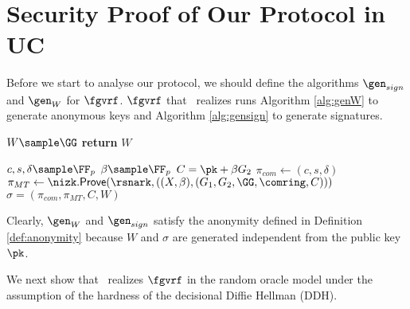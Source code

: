 \section{Security Proof of Our Protocol in UC}
Before we start to analyse our protocol, we should define the algorithms $ \gen_{sign} $ and $ \gen_W $ for $ \fgvrf $. $ \fgvrf $ that \name \ realizes runs Algorithm \ref{alg:genW} to generate  anonymous keys and Algorithm \ref{alg:gensign} to generate signatures.



\begin{algorithm}
	\caption{$\gen_{W}(\comring,\pk,m)$}
	\label{alg:genW}	 	
	\begin{algorithmic}[1]
		\State$ W \sample\GG $
		\State \textbf{return} $ W $
	\end{algorithmic}
	
\end{algorithm}

\begin{algorithm}
	\caption{$\gen_{sign}(\comring,W,\pk,m)$}
	\label{alg:gensign}	 	
	\begin{algorithmic}[1]
		\State $ c,s,\delta \sample \FF_p $
		\State $ \beta \sample \FF_p $
		\State $ C =  \pk + \beta G_2$
		\State $ \pi_{com}  \leftarrow (c,s,\delta)$
		\State $ \pi_{MT} \leftarrow \nizk.\mathsf{Prove}(\rsnark, ((X, \beta),(G_1,G_2, \GG,\comring, C))) $ 
		\State\Return$ \sigma = (\pi_{com},\pi_{MT},C,W) $
	\end{algorithmic}
	
\end{algorithm}

Clearly, $ \gen_{W} $ and $ \gen_{sign} $ satisfy the anonymity defined in Definition \ref{def:anonymity} because $ W $ and $ \sigma $ are generated independent from the public key $ \pk $.


We next show that \name \ realizes $ \fgvrf $  in the random oracle model under the assumption of the hardness of the decisional Diffie Hellman (DDH).

